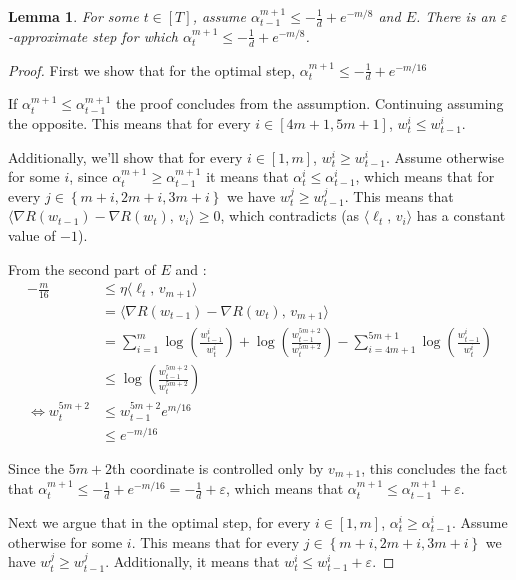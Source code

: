 \documentclass[10pt]{article}
\newtheorem{lemma}[theorem]{Lemma}
\theoremstyle{definition}
\theoremstyle{remark}
\renewcommand{\epsilon}{\varepsilon}
\newcommand\inprod[2]{\langle #1,\,#2 \rangle}
\newcommand{\curly}[1]{ {\left\{ #1 \right\}}}
\newcommand{\roundy}[1]{ {\left( #1 \right)}}
\begin{document}
\begin{lemma} \label{lem:polytope stuck step}
For some $t\in[T]$, assume $\alpha_{t-1}^{m+1} \le -\frac{1}{d} + e^{-m/8}$ and $E$. There is an $\epsilon$-approximate step for which $\alpha_{t}^{m+1} \le -\frac{1}{d} + e^{-m/8}$.
\end{lemma}
\begin{proof}
First we show that for the optimal step, $\alpha_{t}^{m+1} \le -\frac{1}{d} + e^{-m/16}$

If $\alpha_t^{m+1} \le \alpha_{t-1}^{m+1}$ the proof concludes from the assumption. Continuing assuming the opposite. This means that for every $i\in[4m+1,5m+1]$, $w_t^i \le w_{t-1}^i$.

Additionally, we'll show that for every $i\in[1,m]$, $w_t^i\ge w_{t-1}^i$. Assume otherwise for some $i$, since $\alpha_t^{m+1} \ge \alpha_{t-1}^{m+1}$ it means that $\alpha_t^i \le \alpha_{t-1}^i$, which means that for every $j\in\curly{m+i,2m+i,3m+i}$ we have $w_t^{j}\ge w_{t-1}^{j}$. This means that $\inprod{\nabla R(w_{t-1})-\nabla R(w_t)}{v_{i}} \ge 0$, which contradicts  (as $\inprod{\ell_t}{v_i}$ has a constant value of $-1$).

From the second part of $E$ and :
\begin{align*}
    -\frac{m}{16} &\le \eta\inprod{\ell_t}{v_{m+1}} \\
    &= \inprod{\nabla R(w_{t-1})-\nabla R(w_t)}{v_{m+1}}\\
    &= \sum_{i=1}^m\log\roundy{\frac{w_{t-1}^i}{w_t^i}} + \log\roundy{\frac{w_{t-1}^{5m+2}}{w_t^{5m+2}}} - \sum_{i=4m+1}^{5m+1}\log\roundy{\frac{w_{t-1}^i}{w_t^i}}\\
     &\le \log\roundy{\frac{w_{t-1}^{5m+2}}{w_t^{5m+2}}}\\
     \Longleftrightarrow w_t^{5m+2} &\le w_{t-1}^{5m+2}e^{m/16} \\
     &\le e^{-m/16}
\end{align*}

Since the $5m+2$th coordinate is controlled only by $v_{m+1}$, this concludes the fact that $\alpha_{t}^{m+1} \le -\frac{1}{d} + e^{-m/16} = -\frac{1}{d} + \epsilon$, which means that $\alpha_{t}^{m+1} \le \alpha_{t-1}^{m+1} + \epsilon$.

Next we argue that in the optimal step, for every $i\in[1,m]$, $\alpha_t^i \ge \alpha_{t-1}^i$. Assume otherwise for some $i$. This means that for every $j\in\curly{m+i,2m+i,3m+i}$ we have $w_t^{j}\ge w_{t-1}^{j}$. Additionally, it means that $w_t^i \le w_{t-1}^i + \epsilon$.


\end{proof}
\end{document}
